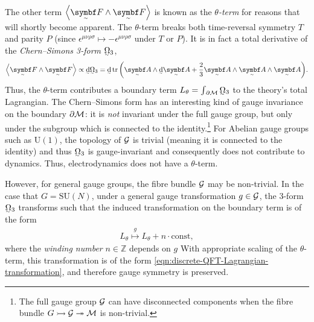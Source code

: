 The other term $\ang{\tsbm F \wedge \tsbm F}$ is known as the \emph{$\theta$-term} for reasons that will shortly become apparent.
The $\theta$-term breaks both time-reversal symmetry $T$ and parity $P$ (since $\epsilon^{\mu\nu\rho\sigma} \mapsto -\epsilon^{\mu\nu\rho\sigma}$ under $T$ or $P$).
It is in fact a total derivative of the \emph{Chern--Simons 3-form} $\csform$,
\begin{align}
	\ang{\tsbm F \wedge \tsbm F}
	\propto \ts\dd\csform
	= \ts\dd\tr\qty(\tsbm A\wedge\ts\dd\tsbm A + \frac{2}{3}\tsbm A\wedge\tsbm A\wedge\tsbm A)
.\end{align}
Thus, the $\theta$-term contributes a boundary term $L_\theta = \int_{\raisemath{1pt}{\,\partial\cal M}}\csform$ to the theory's total Lagrangian.
The Chern--Simons form has an interesting kind of gauge invariance on the boundary $\partial\cal M$: it is \emph{not} invariant under the full gauge group, but only under the subgroup which is connected to the identity.\footnote{
	The full gauge group $\cal G$ can have disconnected components when the fibre bundle $\fibrebundle{G}{\cal G}{\cal M}$ is non-trivial. 
}
For Abelian gauge groups such as $\mathrm{U}(1)$, the topology of $\cal G$ is trivial (meaning it is connected to the identity) and thus $\csform$ is gauge-invariant and consequently does not contribute to dynamics.
Thus, electrodynamics does not have a $\theta$-term.


\cite{Witten_1989}

However, for general gauge groups, the fibre bundle $\cal G$ may be non-trivial.
In the case that $G = \mathrm{SU}(N)$, under a general gauge transformation $g \in \cal G$, the 3-form $\csform$ transforms such that the induced transformation on the boundary term is of the form
\begin{align}
	L_\theta \overset{g}{\mapsto} L_\theta + n\cdot\text{const}
,\end{align}
where the \emph{winding number} $n \in \mathds Z$ depends on $g$ \cite[§\,1]{Witten_1989}
With appropriate scaling of the $\theta$-term, this transformation is of the form \eqref{eqn:discrete-QFT-Lagrangian-transformation}, and therefore gauge symmetry is preserved.

